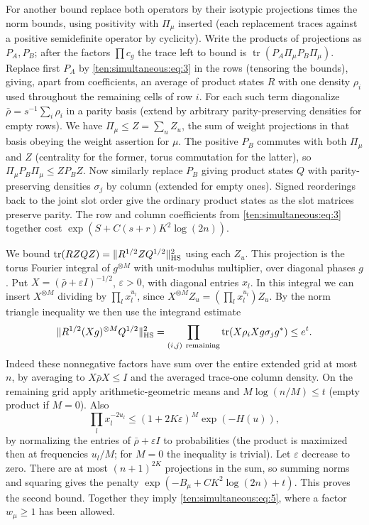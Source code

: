 For another bound replace both operators by their isotypic projections times the norm bounds, using positivity with \(\Pi_\mu\) inserted (each replacement traces against a positive semidefinite operator by cyclicity). Write the products of projections as \(P_A,P_B\); after the factors \(\prod c_g\) the trace left to bound is \(\operatorname{tr}(P_A\Pi_\mu P_B\Pi_\mu)\). Replace first \(P_A\) by \eqref{ten:simultaneous:eq:3} in the rows (tensoring the bounds), giving, apart from coefficients, an average of product states \(R\) with one density \(\rho_i\) used throughout the remaining cells of row \(i\). For each such term diagonalize \(\bar\rho=s^{-1}\sum_i\rho_i\) in a parity basis (extend by arbitrary parity-preserving densities for empty rows). We have \(\Pi_\mu\le Z=\sum_u Z_u\), the sum of weight projections in that basis obeying the weight assertion for \(\mu\). The positive \(P_B\) commutes with both \(\Pi_\mu\) and \(Z\) (centrality for the former, torus commutation for the latter), so \(\Pi_\mu P_B\Pi_\mu\le Z P_B Z\). Now similarly replace \(P_B\) giving product states \(Q\) with parity-preserving densities \(\sigma_j\) by column (extended for empty ones). Signed reorderings back to the joint slot order give the ordinary product states as the slot matrices preserve parity. The row and column coefficients from \eqref{ten:simultaneous:eq:3} together cost \(\exp(S+C(s+r)K^2\log(2n))\).

We bound \(\operatorname{tr}(R Z Q Z)=\|R^{1/2}Z Q^{1/2}\|_{\rm HS}^2\) using each \(Z_u\). This projection is the torus Fourier integral of \(g^{\otimes M}\) with unit-modulus multiplier, over diagonal phases \(g\). Put \(X=(\bar\rho+\varepsilon I)^{-1/2}\), \(\varepsilon>0\), with diagonal entries \(x_l\). In this integral we can insert \(X^{\otimes M}\) dividing by \(\prod_l x_l^{u_l}\), since \(X^{\otimes M} Z_u=(\prod_l x_l^{u_l}) Z_u\). By the norm triangle inequality we then use the integrand estimate
\[
 \|R^{1/2}(Xg)^{\otimes M} Q^{1/2}\|_{\rm HS}^2
   =\prod_{(i,j)\ \mathrm{remaining}}\operatorname{tr}(X\rho_i X g\sigma_j g^*)\le e^t .
\]
Indeed these nonnegative factors have sum over the entire extended grid at most \(n\), by averaging to \(X\bar\rho X\le I\) and the averaged trace-one column density. On the remaining grid apply arithmetic-geometric means and \(M\log(n/M)\le t\) (empty product if \(M=0\)). Also
\[
 \prod_l x_l^{-2u_l}\le (1+2K\varepsilon)^M \exp(-H(u)),
\]
by normalizing the entries of \(\bar\rho+\varepsilon I\) to probabilities (the product is maximized then at frequencies \(u_l/M\); for \(M=0\) the inequality is trivial). Let \(\varepsilon\) decrease to zero. There are at most \((n+1)^{2K}\) projections in the sum, so summing norms and squaring gives the penalty \(\exp(-B_\mu+C K^2\log(2n)+t)\). This proves the second bound. Together they imply \eqref{ten:simultaneous:eq:5}, where a factor \(w_\mu\ge1\) has been allowed.

